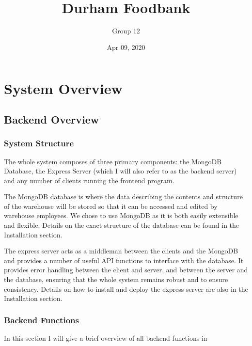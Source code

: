 \documentclass[letterpaper,10pt,english]{sphinxmanual}
\title{Durham Foodbank}
\date{Apr 09, 2020}
\author{Group 12}
\let\oldsubsection\subsection
\renewcommand{\subsection}{\needspace{6\baselineskip}\oldsubsection}
\begin{document}
\pagestyle{empty}
\sphinxmaketitle
\pagestyle{plain}
\sphinxtableofcontents
\pagestyle{normal}
\label{\detokenize{index::doc}}



\chapter{System Overview}
\label{\detokenize{index:system-overview}}

\section{Backend Overview}
\label{\detokenize{docs/System_Overview/Backend_overview:backend-overview}}\label{\detokenize{docs/System_Overview/Backend_overview::doc}}

\subsection{System Structure}
\label{\detokenize{docs/System_Overview/Backend_overview:system-structure}}
The whole system composes of three primary components: the MongoDB
Database, the Express Server (which I will also refer to as the back\sphinxhyphen{}end
server) and any number of clients running the front\sphinxhyphen{}end program.

The MongoDB database is where the data describing the contents and
structure of the warehouse will be stored so that it can be accessed and
edited by warehouse employees. We chose to use MongoDB as it is both
easily extensible and flexible. Details on the exact structure of the
database can be found in the Installation section.

The express server acts as a middle\sphinxhyphen{}man between the clients and the
MongoDB and provides a number of useful API functions to interface with
the database. It provides error handling between the client and server,
and between the server and the database, ensuring that the whole system
remains robust and to ensure consistency. Details on how to install and
deploy the express server are also in the Installation section.


\subsection{Back\sphinxhyphen{}end Functions}
\label{\detokenize{docs/System_Overview/Backend_overview:back-end-functions}}
In this section I will give a brief overview of all back\sphinxhyphen{}end functions
in 
\end{document}
